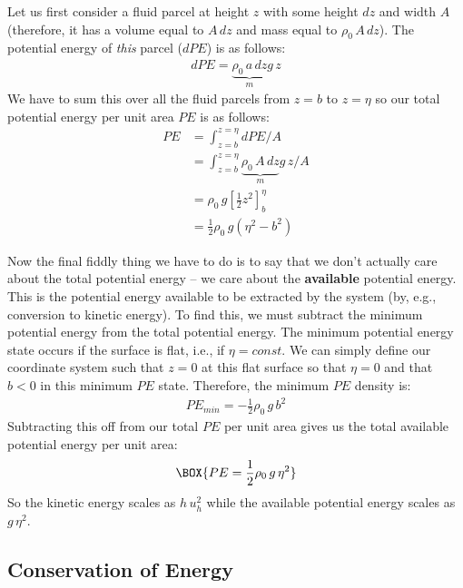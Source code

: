 Let us first consider a fluid parcel at height \(z\) with some height \(dz\) and width \(A\) (therefore, it has a volume equal to \(A\,dz\) and mass equal to \(\rho_0\,A\,dz\)). The potential energy of \textit{this} parcel (\(dPE\)) is as follows:
\begin{align*}
    dPE=\underbrace{\rho_0\,a\,dz}_{m}g\,z
\end{align*}
We have to sum this over all the fluid parcels from \(z=b\) to \(z=\eta\) so our total potential energy per unit area \(PE\) is as follows:
\begin{align*}
    PE &= \int_{z=b}^{z=\eta}dPE/A\\
    &= \int_{z=b}^{z=\eta}\underbrace{\rho_0\,A\,dz}_{m}g\,z/A\\
    &= \rho_0\,g\left[ \frac{1}{2}z^2 \right]_b^\eta\\
    &= \frac{1}{2}\rho_0\,g\left( \eta^2-b^2 \right)
\end{align*}

Now the final fiddly thing we have to do is to say that we don't actually care about the total potential energy – we care about the \textbf{available} potential energy. This is the potential energy available to be extracted by the system (by, e.g., conversion to kinetic energy). To find this, we must subtract the minimum potential energy from the total potential energy. The minimum potential energy state occurs if the surface is flat, i.e., if \(\eta=const\). We can simply define our coordinate system such that \(z=0\) at this flat surface so that \(\eta=0\) and that \(b<0\) in this minimum \(PE\) state. Therefore, the minimum \(PE\) density is:
\begin{align*}
    PE_{min}=-\frac{1}{2}\rho_0 \,g \,b^2
\end{align*}
Subtracting this off from our total \(PE\) per unit area gives us the total available potential energy per unit area:
\begin{align*}
    \BOX{PE = \frac{1}{2}\rho_0 \,g\,\eta^2}
\end{align*}
So the kinetic energy scales as \(h\,u_h^2\) while the available potential energy scales as \(g\,\eta^2\).

\subsection{Conservation of Energy}

